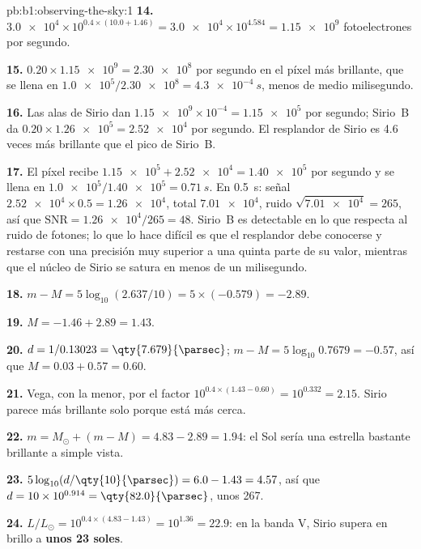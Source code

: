 \begin{solution}{pb:b1:observing-the-sky:1}
\textbf{14.} $\num{3.0e4}\times10^{0.4\times(10.0 + 1.46)} = \num{3.0e4}
\times10^{4.584} = \num{1.15e9}$ fotoelectrones por segundo.

\textbf{15.} $0.20\times\num{1.15e9} = \num{2.30e8}$ por segundo en el píxel más brillante,
que se llena en $\num{1.0e5}/\num{2.30e8} =
\qty{4.3e-4}{s}$, menos de medio milisegundo.

\textbf{16.} Las alas de Sirio dan $\num{1.15e9}\times10^{-4} =
\num{1.15e5}$ por segundo; Sirio~B da $0.20\times\num{1.26e5} =
\num{2.52e4}$ por segundo. El resplandor de Sirio es 4.6 veces más brillante que el pico de
Sirio~B.

\textbf{17.} El píxel recibe $\num{1.15e5} + \num{2.52e4} = \num{1.40e5}$
por segundo y se llena en $\num{1.0e5}/\num{1.40e5} = \qty{0.71}{s}$. En
\qty{0.5}{s}: señal $\num{2.52e4}\times0.5 = \num{1.26e4}$, total
$\num{7.01e4}$, ruido $\sqrt{\num{7.01e4}} = 265$, así que $\mathrm{SNR} =
\num{1.26e4}/265 = 48$. Sirio~B es detectable en lo que respecta al ruido de fotones; lo que
lo hace difícil es que el resplandor debe conocerse y restarse con una precisión muy superior a
una quinta parte de su valor, mientras que el núcleo de Sirio se satura en menos de un milisegundo.

\textbf{18.} $m - M = 5\log_{10}(2.637/10) = 5\times(-0.579) = -2.89$.

\textbf{19.} $M = -1.46 + 2.89 = 1.43$.

\textbf{20.} $d = 1/0.13023 = \qty{7.679}{\parsec}$;
$m - M = 5\log_{10}0.7679 = -0.57$, así que $M = 0.03 + 0.57 = 0.60$.

\textbf{21.} Vega, con la  menor, por el factor
$10^{0.4\times(1.43 - 0.60)} = 10^{0.332} = 2.15$. Sirio parece más brillante solo porque
está más cerca.

\textbf{22.} $m = M_\odot + (m - M) = 4.83 - 2.89 = 1.94$: el Sol sería una estrella bastante
brillante a simple vista.

\textbf{23.} $5\log_{10}(d/\qty{10}{\parsec}) = 6.0 - 1.43 = 4.57$, así que
$d = 10\times10^{0.914} = \qty{82.0}{\parsec}$, unos \qty{267}{\lightyear}.

\textbf{24.} $L/L_\odot = 10^{0.4\times(4.83 - 1.43)} = 10^{1.36} = 22.9$:
en la banda V, Sirio supera en brillo a \textbf{unos 23 soles}.
\end{solution}
